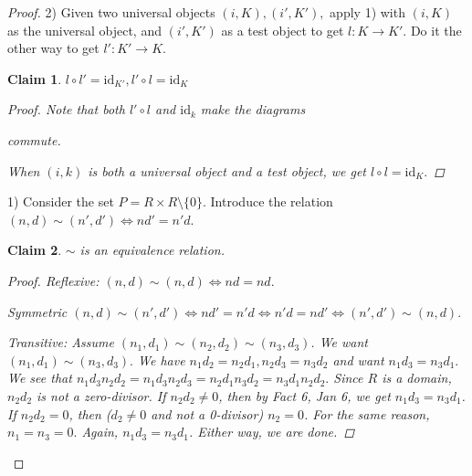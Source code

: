 \documentclass{amsart}
\newtheorem*{claim}{Claim}
\theoremstyle{definition}
\theoremstyle{remark}
\begin{document}
\begin{proof}

2) Given two universal objects $(i,K),(i',K'),$ apply 1) with $(i,K)$ as the universal object, and $(i',K')$ as a test object to get $l:K\rightarrow K'$. Do it the other way to get $l':K'\longrightarrow K.$

\begin{claim}

$l\circ l'=\text{id}_{K'},l'\circ l=\text{id}_K$

\begin{proof}

Note that both $l'\circ l$ and $\text{id}_k$ make the diagrams


 commute.

When $(i,k)$ is both a universal object and a test object, we get $l\circ l=\text{id}_K.$ \end{proof}
\end{claim}


1) Consider the set $P=R\times R\setminus\{0\}$. Introduce the relation $(n,d)\sim (n',d')\iff nd'=n'd$.

\begin{claim}

$\sim$ is an equivalence relation. 

\begin{proof} 

Reflexive: $(n,d)\sim(n,d)\iff nd=nd.$

Symmetric $(n,d)\sim(n',d')\iff nd'=n'd\iff n'd=nd'\iff (n',d')\sim (n,d).$

Transitive: Assume $(n_1,d_1)\sim(n_2,d_2)\sim(n_3,d_3)$. We want $(n_1,d_1)\sim(n_3,d_3).$
We have $n_1d_2=n_2d_1,n_2d_3=n_3d_2$ and want $n_1d_3=n_3d_1.$
We see that $n_1d_3 n_2d_2=n_1d_3n_2d_3=n_2d_1n_3d_2=n_3d_1n_2d_2.$
Since $R$ is a domain, $n_2d_2$ is not a zero-divisor. If $n_2d_2\ne 0$, then by Fact 6, Jan 6, we get $n_1d_3=n_3d_1$. If $n_2d_2=0$, then ($d_2\ne 0$ and not a 0-divisor) $n_2=0$. For the same reason, $n_1=n_3=0.$ Again, $n_1d_3=n_3d_1$. Either way, we are done.
\end{proof}
\end{claim}


\end{proof}
\end{document}
